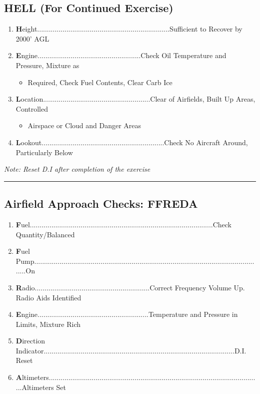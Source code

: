 \documentclass[a4paper]{article}
\newenvironment{checklist}{
  \begin{itemize}[leftmargin=*, align=left]
    \setlength{\itemsep}{2pt}
    \setlength{\parskip}{0pt}
    \setlength{\parsep}{0pt}
}{
  \end{itemize}
}
\newenvironment{numberedchecklist}{
  \begin{enumerate}[label=\arabic*., leftmargin=*, align=left]
    \setlength{\itemsep}{2pt}
    \setlength{\parskip}{0pt}
    \setlength{\parsep}{0pt}
}{
  \end{enumerate}
}
\begin{document}
\subsection*{HELL (For Continued Exercise)}
\begin{numberedchecklist}
\item \textbf{H}eight....................................................................Sufficient to Recover by 2000’ AGL
\item \textbf{E}ngine.....................................................Check Oil Temperature and Pressure, Mixture as
  \begin{checklist}
  \item Required, Check Fuel Contents, Clear Carb Ice
  \end{checklist}
\item \textbf{L}ocation.......................................................Clear of Airfields, Built Up Areas, Controlled
  \begin{checklist}
  \item Airspace or Cloud and Danger Areas
  \end{checklist}
\item \textbf{L}ookout...............................................................Check No Aircraft Around, Particularly Below
\end{numberedchecklist}

\textit{Note: Reset D.I after completion of the exercise}

\rule{\linewidth}{0.4pt}

\subsection*{Airfield Approach Checks: FFREDA}
\begin{numberedchecklist}
\item \textbf{F}uel..............................................................................................Check Quantity/Balanced
\item \textbf{F}uel Pump......................................................................................................................On
\item \textbf{R}adio...........................................................Correct Frequency Volume Up. Radio Aids Identified
\item \textbf{E}ngine.........................................................Temperature and Pressure in Limits, Mixture Rich
\item \textbf{D}irection Indicator..................................................................................................D.I. Reset
\item \textbf{A}ltimeters.............................................................................................................Altimeters Set
\end{numberedchecklist}
\end{document}
